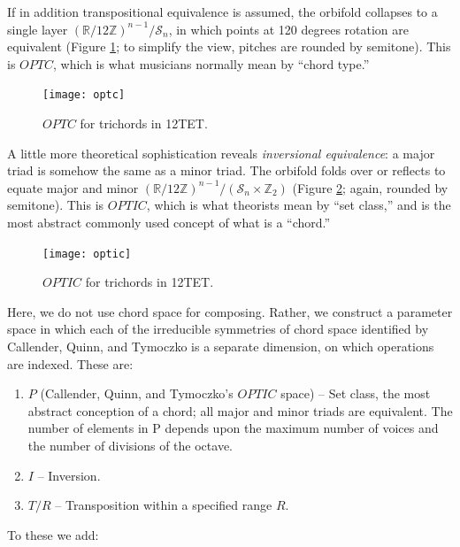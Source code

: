 \documentclass[english,11pt,letterpaper,onecolumn]{scrartcl}
\numberwithin{equation}{section}
\begin{document}
    If in addition transpositional equivalence is assumed, the orbifold collapses 
    to a single layer $\left(\mathbb{R}/12\mathbb{Z}\right)^{n-1}/\mathcal{S}_{n}$, 
    in which points at 120 degrees rotation are equivalent (Figure \ref{fig:optc}; 
    to simplify the view, pitches are rounded by semitone). This is $OPTC$, which 
    is what musicians normally mean by ``chord type.''
    
    \begin{figure}
        \centerline{\texttt{[image: optc]}}
        \caption{\label{fig:optc} 
            $OPTC$ for trichords in 12TET.}
    \end{figure}
    
    A little more theoretical sophistication reveals \textit{inversional 
        equivalence}: a major triad is somehow the same as a minor triad. The 
    orbifold folds over or reflects to equate major and minor 
    $\left(\mathbb{R}/12\mathbb{Z}\right)^{n-1}/(\mathcal{S}_{n} \times 
    \mathbb{Z}_{2})$ (Figure \ref{fig:optic}; again, rounded by semitone). This is 
    $OPTIC$, which is what theorists mean by ``set class,'' and is the most 
    abstract commonly used concept of what is a ``chord.''
    
    \begin{figure}
        \centerline{\texttt{[image: optic]}}
        \caption{\label{fig:optic} 
            $OPTIC$ for trichords in 12TET.}
    \end{figure}
    
    Here, we do not use chord space for composing. Rather, we construct a parameter 
    space in which each of the irreducible symmetries of chord space identified by 
    Callender, Quinn, and Tymoczko is a separate dimension, on which operations are 
    indexed. These are:
    
    \begin{enumerate}
        \item $P$ (Callender, Quinn, and Tymoczko's $OPTIC$ space) -- Set class, the 
        most abstract conception of a chord; all major and minor triads are equivalent. 
        The number of elements in P depends upon the maximum number of voices and the 
        number of divisions of the octave.
        \item $I$ -- Inversion.
        \item $T/R$ -- Transposition within a specified range $R$.
    \end{enumerate}
    
    \noindent To these we add:
    
\end{document}
